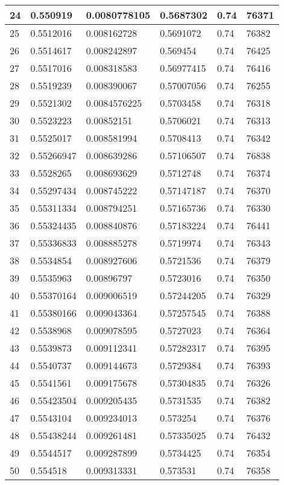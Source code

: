 \begin{longtable}{|l|l|l|l|l|l|}
24 & 0.550919 & 0.0080778105 & 0.5687302 & 0.74 & 76371 \\ \hline 
25 & 0.5512016 & 0.008162728 & 0.5691072 & 0.74 & 76382 \\ \hline 
26 & 0.5514617 & 0.008242897 & 0.569454 & 0.74 & 76425 \\ \hline 
27 & 0.5517016 & 0.008318583 & 0.56977415 & 0.74 & 76416 \\ \hline 
28 & 0.5519239 & 0.008390067 & 0.57007056 & 0.74 & 76255 \\ \hline 
29 & 0.5521302 & 0.0084576225 & 0.5703458 & 0.74 & 76318 \\ \hline 
30 & 0.5523223 & 0.00852151 & 0.5706021 & 0.74 & 76313 \\ \hline 
31 & 0.5525017 & 0.008581994 & 0.5708413 & 0.74 & 76342 \\ \hline 
32 & 0.55266947 & 0.008639286 & 0.57106507 & 0.74 & 76838 \\ \hline 
33 & 0.5528265 & 0.008693629 & 0.5712748 & 0.74 & 76374 \\ \hline 
34 & 0.55297434 & 0.008745222 & 0.57147187 & 0.74 & 76370 \\ \hline 
35 & 0.55311334 & 0.008794251 & 0.57165736 & 0.74 & 76330 \\ \hline 
36 & 0.55324435 & 0.008840876 & 0.57183224 & 0.74 & 76441 \\ \hline 
37 & 0.55336833 & 0.008885278 & 0.5719974 & 0.74 & 76343 \\ \hline 
38 & 0.5534854 & 0.008927606 & 0.5721536 & 0.74 & 76379 \\ \hline 
39 & 0.5535963 & 0.00896797 & 0.5723016 & 0.74 & 76350 \\ \hline 
40 & 0.55370164 & 0.009006519 & 0.57244205 & 0.74 & 76329 \\ \hline 
41 & 0.55380166 & 0.009043364 & 0.57257545 & 0.74 & 76388 \\ \hline 
42 & 0.5538968 & 0.009078595 & 0.5727023 & 0.74 & 76364 \\ \hline 
43 & 0.5539873 & 0.009112341 & 0.57282317 & 0.74 & 76395 \\ \hline 
44 & 0.5540737 & 0.009144673 & 0.5729384 & 0.74 & 76393 \\ \hline 
45 & 0.5541561 & 0.009175678 & 0.57304835 & 0.74 & 76326 \\ \hline 
46 & 0.55423504 & 0.009205435 & 0.5731535 & 0.74 & 76382 \\ \hline 
47 & 0.5543104 & 0.009234013 & 0.573254 & 0.74 & 76376 \\ \hline 
48 & 0.55438244 & 0.009261481 & 0.57335025 & 0.74 & 76432 \\ \hline 
49 & 0.5544517 & 0.009287899 & 0.5734425 & 0.74 & 76354 \\ \hline 
50 & 0.554518 & 0.009313331 & 0.573531 & 0.74 & 76358 \\ \hline 
\end{longtable}